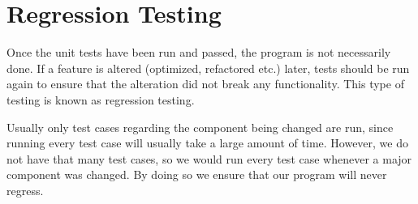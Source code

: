 \section{Regression Testing}
Once the unit tests have been run and passed, the program is not necessarily done.
If a feature is altered (optimized, refactored etc.) later, tests should be run again to ensure that the alteration did not break any functionality. \cite{waterfallroyce} This type of testing is known as regression testing.

Usually only test cases regarding the component being changed are run, since running every test case will usually take a large amount of time.
However, we do not have that many test cases, so we would run every test case whenever a major component was changed.
By doing so we ensure that our program will never regress.
